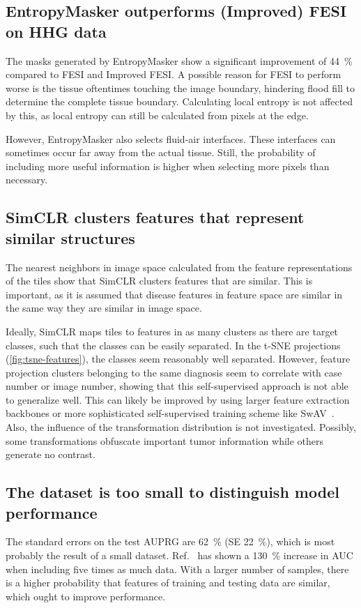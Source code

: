 \subsection{EntropyMasker outperforms (Improved) FESI on HHG data}
The masks generated by EntropyMasker show a significant improvement of \qty{44}{\percent} compared to FESI and Improved FESI.
A possible reason for FESI to perform worse is the tissue oftentimes touching the image boundary, hindering flood fill to determine the complete tissue boundary.
Calculating local entropy is not affected by this, as local entropy can still be calculated from pixels at the edge.

However, EntropyMasker also selects fluid-air interfaces.
These interfaces can sometimes occur far away from the actual tissue.
Still, the probability of including more useful information is higher when selecting more pixels than necessary.

\subsection{SimCLR clusters features that represent similar structures}
The nearest neighbors in image space calculated from the feature representations of the tiles show that SimCLR clusters features that are similar.
This is important, as it is assumed that disease features in feature space are similar in the same way they are similar in image space.

Ideally, SimCLR maps tiles to features in as many clusters as there are target classes, such that the classes can be easily separated.
In the t-SNE projections (\cref{fig:tsne-features}), the classes seem reasonably well separated.
However, feature projection clusters belonging to the same diagnosis seem to correlate with case number or image number, showing that this self-supervised approach is not able to generalize well.
This can likely be improved by using larger feature extraction backbones or more sophisticated self-supervised training scheme like SwAV~.
Also, the influence of the transformation distribution is not investigated.
Possibly, some transformations obfuscate important tumor information while others generate no contrast.

\subsection{The dataset is too small to distinguish model performance}
The standard errors on the test AUPRG are \qty{62}{\percent} (SE \qty{22}{\percent}), which is most probably the result of a small dataset.
Ref.~ has shown a \qty{130}{\percent} increase in AUC when including five times as much data.
With a larger number of samples, there is a higher probability that features of training and testing data are similar, which ought to improve performance.

